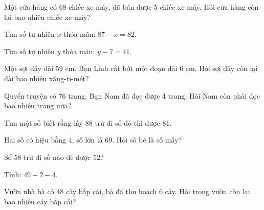 \begin{ex}
Một cửa hàng có 68 chiếc xe máy, đã bán được 5 chiếc xe máy. Hỏi cửa hàng còn lại bao nhiêu chiếc xe máy?
\end{ex}

\begin{ex}
Tìm số tự nhiên $x$ thỏa mãn: $87 - x = 82$.
\end{ex}

\begin{ex}
Tìm số tự nhiên $y$ thỏa mãn: $y - 7 = 41$.
\end{ex}

\begin{ex}
Một sợi dây dài 59 cm. Bạn Linh cắt bớt một đoạn dài 6 cm. Hỏi sợi dây còn lại dài bao nhiêu xăng-ti-mét?
\end{ex}

\begin{ex}
Quyển truyện có 76 trang. Bạn Nam đã đọc được 4 trang. Hỏi Nam còn phải đọc bao nhiêu trang nữa?
\end{ex}

\begin{ex}
Tìm một số biết rằng lấy 88 trừ đi số đó thì được 81.
\end{ex}

\begin{ex}
Hai số có hiệu bằng 4, số lớn là 69. Hỏi số bé là số mấy?
\end{ex}

\begin{ex}
Số 58 trừ đi số nào để được 52?
\end{ex}

\begin{ex}
Tính: $49 - 2 - 4$.
\end{ex}

\begin{ex}
Vườn nhà bà có 48 cây bắp cải, bà đã thu hoạch 6 cây. Hỏi trong vườn còn lại bao nhiêu cây bắp cải?
\end{ex}

